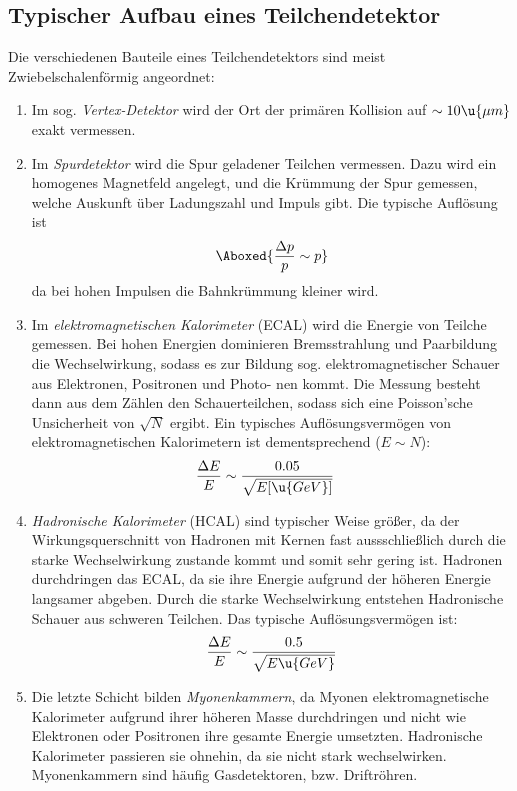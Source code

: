 \documentclass[final]{summery_5.0}
\begin{document}
\subsection{Typischer Aufbau eines Teilchendetektor}
Die verschiedenen Bauteile eines Teilchendetektors sind meist Zwiebelschalenförmig angeordnet:
\begin{enumerate}
    \item Im sog. \emph{Vertex-Detektor} wird der Ort der primären Kollision auf $\sim 10\u{\mu m}$ exakt vermessen.
    \item Im \emph{Spurdetektor} wird die Spur geladener Teilchen vermessen. Dazu wird ein homogenes Magnetfeld angelegt, und die Krümmung der Spur gemessen, welche Auskunft über Ladungszahl und Impuls gibt. Die typische Auflösung ist 
    \begin{align*}
        \Aboxed{\frac{\Delta p }{p} \sim p }
    \end{align*}
    da bei hohen Impulsen die Bahnkrümmung kleiner wird.
    \item Im \emph{elektromagnetischen Kalorimeter} (ECAL) wird die Energie von Teilche gemessen.  Bei hohen Energien dominieren
    Bremsstrahlung und Paarbildung die Wechselwirkung, sodass es zur Bildung
    sog. elektromagnetischer Schauer aus Elektronen, Positronen und Photo-
    nen kommt. Die Messung besteht dann aus dem Zählen den Schauerteilchen,
    sodass sich eine Poisson'sche Unsicherheit von $\sqrt{N}$ ergibt. Ein typisches Auflösungsvermögen von elektromagnetischen Kalorimetern ist dementsprechend
    ($E\sim N $):
    \begin{align*}
        \frac{\Delta E}{E} &\sim \frac{0.05}{\sqrt{E[\u{GeV}]}}
    \end{align*}
    \item \emph{Hadronische Kalorimeter} (HCAL) sind typischer Weise größer, da der Wirkungsquerschnitt von Hadronen mit Kernen fast aussschließlich durch die starke Wechselwirkung zustande kommt und somit sehr gering ist. Hadronen durchdringen das ECAL, da sie ihre Energie aufgrund der höheren Energie langsamer abgeben. Durch die starke Wechselwirkung entstehen Hadronische Schauer aus schweren Teilchen. Das typische Auflösungsvermögen ist:
    \begin{align*}
        \frac{\Delta E}{E} \sim \frac{0.5}{\sqrt{E\u{GeV}}}
    \end{align*}
    \item Die letzte Schicht bilden \emph{Myonenkammern}, da Myonen elektromagnetische Kalorimeter aufgrund ihrer höheren Masse durchdringen und nicht wie Elektronen oder Positronen ihre gesamte Energie umsetzten.
    Hadronische Kalorimeter passieren sie ohnehin, da sie nicht stark wechselwirken. Myonenkammern sind häufig Gasdetektoren, bzw. Driftröhren.
\end{enumerate}
\end{document}
